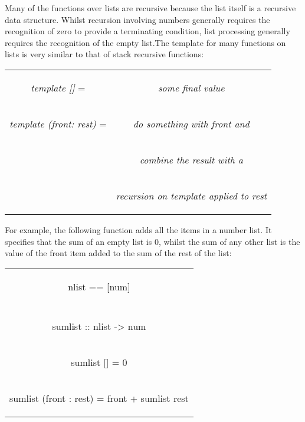 \documentclass[11pt]{article}
\begin{document}
Many of the functions over lists are recursive because the list itself is a recursive
data structure. Whilst recursion involving numbers generally requires the recognition
of zero to provide a terminating condition, list processing generally requires
the recognition of the empty list.The template for many functions on lists is very similar to that of stack recursive
functions:

\begin{center}
\begin{tabular}{c c}

\textit{ template []} = &\begin{flushleft}  \textit{some final value} \end{flushleft}  \\

\textit{ template (front: rest)} =
 &\begin{flushleft}\textit{do something with front and} \end{flushleft}  \\
 
 &\begin{flushleft}\textit{combine the result with a}\end{flushleft}\\
 
 &\begin{flushleft} \textit{recursion on template applied to rest} \end{flushleft}
 
\end{tabular}
\end{center}
For example, the following function adds all the items in a number list. It specifies
that the sum of an empty list is 0, whilst the sum of any other list is the value of
the front item added to the sum of the rest of the list:\\


\begin{tabular}{ |c| } 
 \hline
\begin{flushleft} nlist == [num] \end{flushleft} \\
\\
\begin{flushleft}sumlist :: nlist -> num\end{flushleft} \\
\begin{flushleft}sumlist [] = 0\end{flushleft} \\
\begin{flushleft}sumlist (front : rest) = front + sumlist rest\end{flushleft} \\
\hline
\end{tabular}
\label{Tab:1}
\end{document}
